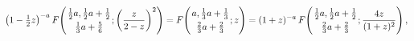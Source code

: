 \[\left(1-\tfrac{1}{2}z\right)^{-a}\mathop{F\/}\nolimits\!\left({\tfrac{1}{2}a,%
\tfrac{1}{2}a+\tfrac{1}{2}\atop\tfrac{1}{3}a+\tfrac{5}{6}};\left(\frac{z}{2-z}%
\right)^{2}\right)=\mathop{F\/}\nolimits\!\left({a,\tfrac{1}{3}a+\tfrac{1}{3}%
\atop\tfrac{2}{3}a+\tfrac{2}{3}};z\right)=(1+z)^{-a}\mathop{F\/}\nolimits\!%
\left({\tfrac{1}{2}a,\tfrac{1}{2}a+\tfrac{1}{2}\atop\tfrac{2}{3}a+\tfrac{2}{3}%
};\frac{4z}{(1+z)^{2}}\right),\]